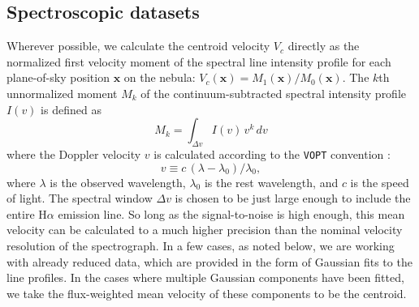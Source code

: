 \documentclass[fleqn,usenatbib, useAMS, a4paper]{mnras}
\newcommand\ha{\ensuremath{\text{H}\alpha}}
\begin{document}
\subsection{Spectroscopic datasets}
\label{sec:spectr-datas}
\newcommand\xx{\ensuremath{\boldsymbol{x}}}
Wherever possible, we calculate the centroid velocity \(V_c\)
directly as the normalized first velocity moment of the spectral line intensity profile
for each plane-of-sky position \(\xx\) on the nebula:
\(V_{c}(\xx) = M_1(\xx) / M_0(\xx)\).
The \(k\)th unnormalized moment \(M_k\) of the continuum-subtracted
spectral intensity profile \(I(v)\)
is defined as
\begin{equation}
  \label{eq:kth-moment}
  M_k = \int_{\Delta v} I(v) \, v^k \, dv
\end{equation}
where the Doppler velocity \(v\) is calculated according to
the \texttt{VOPT} convention
\citetext{Eq.~[32] of \citealt{Greisen:2006a}}:
\begin{equation}
  \label{eq:optical-velocity}
  v \equiv c\, (\lambda - \lambda_0) / \lambda_0 ,
\end{equation}
where \(\lambda\) is the observed wavelength,
\(\lambda_0\) is the rest wavelength, and \(c\) is the speed of light.
The spectral window \(\Delta v\) is chosen to be just large enough to include
the entire \ha{} emission line.
So long as the signal-to-noise is high enough,
this mean velocity can be calculated to a much higher precision
than the nominal velocity resolution of the spectrograph. 
In a few cases, as noted below, we are working with already reduced data,
which are provided in the form of Gaussian fits to the line profiles.
In the cases where multiple Gaussian components have been fitted,
we take the flux-weighted mean velocity of these components to be the centroid.
\end{document}
